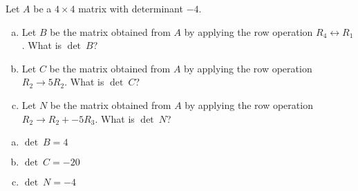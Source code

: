 
\begin{exerciseStatement}


Let \(A\) be a \(4 \times 4\) matrix with determinant \( -4 \).


\begin{enumerate}[(a)]
\item Let \(B\) be the matrix obtained from \(A\) by applying the row operation \( R_4 \leftrightarrow R_1 \). What is \(\operatorname{det}\ B\)?
\item Let \(C\) be the matrix obtained from \(A\) by applying the row operation \( R_2 \to 5R_2 \). What is \(\operatorname{det}\ C\)?
\item Let \(N\) be the matrix obtained from \(A\) by applying the row operation \( R_2 \to R_2 + -5R_3 \). What is \(\operatorname{det}\ N\)?
\end{enumerate}
    
\end{exerciseStatement}
    
\begin{exerciseAnswer} 

\begin{enumerate}[(a)]
\item \(\operatorname{det}\ B= 4 \)
\item \(\operatorname{det}\ C= -20 \)
\item \(\operatorname{det}\ N= -4 \)
\end{enumerate}
    
\end{exerciseAnswer}
    
